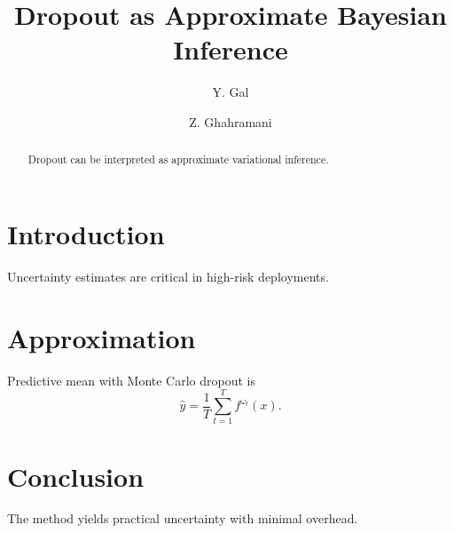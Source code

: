 \documentclass[conference]{IEEEtran}
\title{Dropout as Approximate Bayesian Inference}
\author{Y. Gal \and Z. Ghahramani}
\begin{document}
\maketitle
\begin{abstract}
Dropout can be interpreted as approximate variational inference.
\end{abstract}
\section{Introduction}
Uncertainty estimates are critical in high-risk deployments.
\section{Approximation}
Predictive mean with Monte Carlo dropout is
\begin{equation}
\hat{y}=\frac{1}{T}\sum_{t=1}^{T} f^{\omega_t}(x).
\end{equation}
\section{Conclusion}
The method yields practical uncertainty with minimal overhead.


\end{document}
